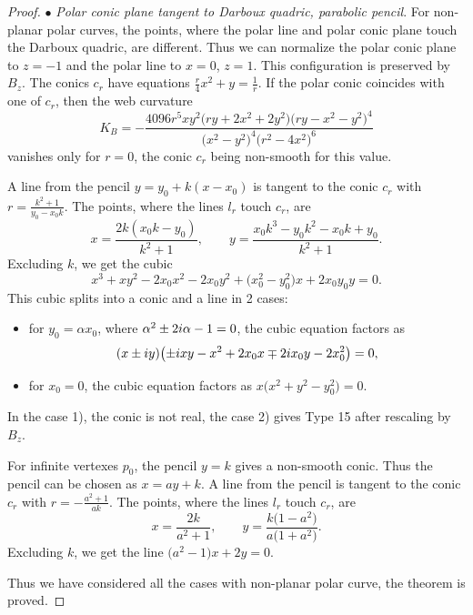 \documentclass[11pt]{article}
\numberwithin{equation}{section}
\numberwithin{equation}{section}
\begin{document}
\begin{proof}
$\bullet$ {\it Polar conic plane tangent to Darboux quadric, parabolic pencil}.
For non-planar polar curves, the points, where the polar line and polar conic plane touch the Darboux quadric, are different. Thus we can normalize the polar conic plane to $z=-1$ and the polar line to $x=0$, $z=1$. This configuration is preserved by $B_z$. The conics $c_r$ have equations
$
\frac{r}{4}x^2 + y =\frac{1}{r}$.
If the polar conic coincides with one of $c_r$, then the web curvature
\[
K_B=-\frac{4096r^5xy^2\bigl(ry + 2x^2 + 2y^2\bigr)\bigl(ry - x^2 - y^2\bigr)^4}{\bigl(x^2 - y^2\bigr)^4\bigl(r^2 - 4x^2\bigr)^6}
\]
vanishes only for $r=0$, the conic $c_r$ being non-smooth for this value.

 A line from the pencil $y=y_0+k(x-x_0)$ is tangent to the conic $c_r$ with
$
r=\frac{k^2+1}{y_0-x_0k}$.
 The points, where the lines $l_r$ touch $c_r$, are
\[
x=\frac{2k(x_0k - y_0)}{k^2 + 1},\qquad
y=\frac{x_0k^3 -y_0 k^2 -x_0 k + y_0}{k^2 + 1}.
\]
Excluding $k$, we get the cubic
\[
x^3+ xy^2 - 2x_0x^2- 2x_0y^2 + \bigl(x_0^2 - y_0^2\bigr)x + 2x_0y_0y=0.
\]
This cubic splits into a conic and a line in 2
 cases:
 \begin{itemize}
\item[(1)] for $y_0=\alpha x_0$, where $\alpha ^2 \pm 2{\rm i} \alpha -1=0$, the cubic equation factors as
\[
(x \pm {\rm i} y)\bigl(\pm {\rm i} xy -x^2 +2x_0x\mp 2{\rm i} x_0y - 2x_0^2\bigr)=0,
\]
\item[(2)] for $x_0=0$, the cubic equation factors as $x\bigl(x^2+y^2-y_0^2\bigr)=0$.
 \end{itemize}
 In the case 1), the conic is not real, the case 2) gives Type 15 after rescaling by $B_z$.

 For infinite vertexes $p_0$, the pencil $y=k$ gives a non-smooth conic. Thus the pencil can be chosen as $x=ay+k$. A line from the pencil is tangent to the conic $c_r$ with
$
r=-\frac{a^2+ 1}{ak}$.
 The points, where the lines $l_r$ touch $c_r$, are
\[
x=\frac{2k}{a^2+1}, \qquad y=\frac{k\bigl(1- a^2 \bigr)}{a\bigl(1+a^2\bigr)}.
\]
Excluding $k$, we get the line
$\bigl(a^2 - 1\bigr)x + 2y=0$.

 Thus we have considered all the cases with non-planar polar curve, the theorem is proved.
\end{proof}

\setcounter{section}{7}
\end{document}
